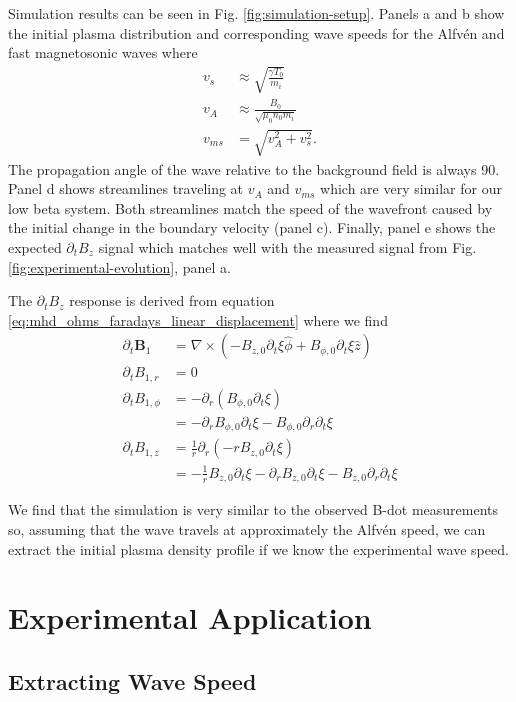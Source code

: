 Simulation results can be seen in Fig. \ref{fig:simulation-setup}. Panels a and b show the initial plasma distribution and corresponding wave speeds for the Alfv\'en and fast magnetosonic waves where
\begin{align}
    v_s &\approx \sqrt{\frac{\gamma T_0}{m_i}} \\
    v_A &\approx \frac{B_0}{\sqrt{\mu_0 n_0 m_i}} \\
    v_{ms} &= \sqrt{v_A^2 + v_s^2}.
\end{align}
The propagation angle of the wave relative to the background field is always 90\textdegree. Panel d shows streamlines traveling at $v_A$ and $v_{ms}$ which are very similar for our low beta system. Both streamlines match the speed of the wavefront caused by the initial change in the boundary velocity (panel c). Finally, panel e shows the expected $\partial_t B_z$ signal which matches well with the measured signal from Fig. \ref{fig:experimental-evolution}, panel a.

The $\partial_t B_z$ response is derived from equation \ref{eq:mhd_ohms_faradays_linear_displacement} where we find
\begin{align*}
  \partial_t \bm{B}_1 &= \nabla \times (-B_{z, 0} \partial_t \xi \hat{\phi} + B_{\phi, 0} \partial_t \xi \hat{z}) \\
  \partial_t B_{1, r} &= 0 \\
  \partial_t B_{1, \phi} &= -\partial_r (B_{\phi, 0} \partial_t \xi) \\
  &= - \partial_r B_{\phi, 0} \partial_t \xi - B_{\phi, 0} \partial_{r} \partial_{t} \xi \\
  \partial_t B_{1, z} &= \frac{1}{r} \partial_r (-r B_{z, 0} \partial_t \xi) \\
  &= -\frac{1}{r} B_{z, 0} \partial_t \xi - \partial_r B_{z, 0} \partial_t \xi - B_{z, 0} \partial_{r} \partial_{t} \xi
\end{align*}

We find that the simulation is very similar to the observed B-dot measurements so, assuming that the wave travels at approximately the Alfv\'en speed, we can extract the initial plasma density profile if we know the experimental wave speed.

\section{Experimental Application}

\subsection{Extracting Wave Speed}


